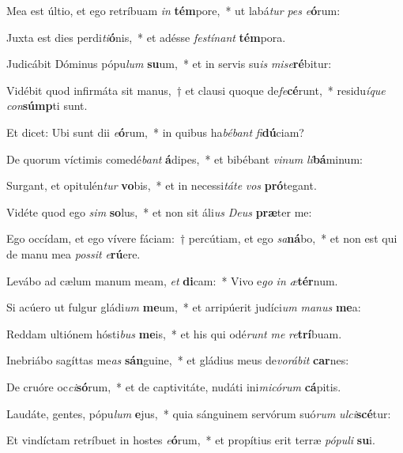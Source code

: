 \item Mea est últio, et ego retríbuam \textit{in} \textbf{tém}pore,~* ut labá\textit{tur} \textit{pes} \textit{e}\textbf{ó}rum:
\item Juxta est dies perdi\textit{ti}\textbf{ó}nis,~* et adésse \textit{fes}\textit{tí}\textit{nant} \textbf{tém}pora.
\item Judicábit Dóminus pópu\textit{lum} \textbf{su}um,~* et in servis su\textit{is} \textit{mi}\textit{se}\textbf{ré}bitur:
\item Vidébit quod infirmáta sit manus,~† et clausi quoque de\textit{fe}\textbf{cé}runt,~* residu\textit{í}\textit{que} \textit{con}\textbf{súmp}ti sunt.
\item Et dicet: Ubi sunt dii \textit{e}\textbf{ó}rum,~* in quibus ha\textit{bé}\textit{bant} \textit{fi}\textbf{dú}ciam?
\item De quorum víctimis comedé\textit{bant} \textbf{á}dipes,~* et bibébant \textit{vi}\textit{num} \textit{li}\textbf{bá}minum:
\item Surgant, et opitulén\textit{tur} \textbf{vo}bis,~* et in necessi\textit{tá}\textit{te} \textit{vos} \textbf{pró}tegant.
\item Vidéte quod ego \textit{sim} \textbf{so}lus,~* et non sit áli\textit{us} \textit{De}\textit{us} \textbf{præ}ter me:
\item Ego occídam, et ego vívere fáciam:~† percútiam, et ego \textit{sa}\textbf{ná}bo,~* et non est qui de manu mea \textit{pos}\textit{sit} \textit{e}\textbf{rú}ere.
\item Levábo ad cælum manum meam, \textit{et} \textbf{di}cam:~* Vivo e\textit{go} \textit{in} \textit{æ}\textbf{tér}num.
\item Si acúero ut fulgur gládi\textit{um} \textbf{me}um,~* et arripúerit judíci\textit{um} \textit{ma}\textit{nus} \textbf{me}a:
\item Reddam ultiónem hósti\textit{bus} \textbf{me}is,~* et his qui odé\textit{runt} \textit{me} \textit{re}\textbf{trí}buam.
\item Inebriábo sagíttas me\textit{as} \textbf{sán}guine,~* et gládius meus de\textit{vo}\textit{rá}\textit{bit} \textbf{car}nes:
\item De cruóre oc\textit{ci}\textbf{só}rum,~* et de captivitáte, nudáti ini\textit{mi}\textit{có}\textit{rum} \textbf{cá}pitis.
\item Laudáte, gentes, pópu\textit{lum} \textbf{e}jus,~* quia sánguinem servórum suó\textit{rum} \textit{ul}\textit{ci}\textbf{scé}tur:
\item Et vindíctam retríbuet in hostes \textit{e}\textbf{ó}rum,~* et propítius erit terræ \textit{pó}\textit{pu}\textit{li} \textbf{su}i.
